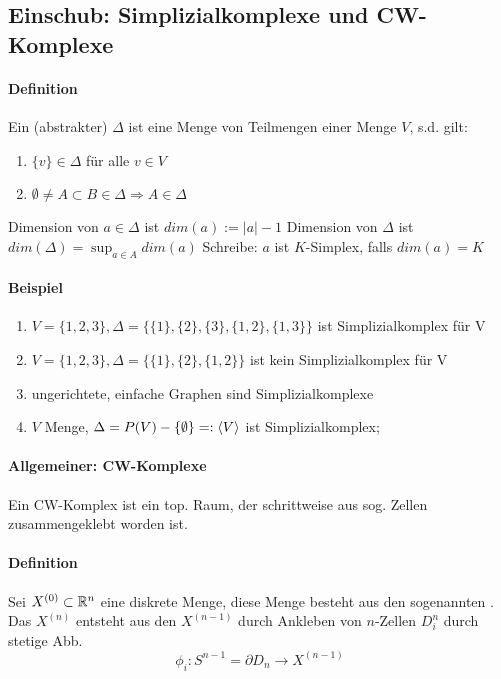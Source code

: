 \documentclass{article}
\begin{document}
\subsection{Einschub: Simplizialkomplexe und CW-Komplexe}
\paragraph{Definition} Ein (abstrakter)  $\Delta$ ist eine Menge von Teilmengen einer Menge $V$, s.d. gilt:
\begin{enumerate}
	\item $\{v\} \in \Delta$ für alle $v \in V$
	\item $\emptyset\neq A \subset B \in \Delta \Longrightarrow A \in \Delta$
\end{enumerate}
Dimension von $a \in \Delta$ ist $dim(a) := |a| -1$
Dimension von $\Delta$ ist $dim(\Delta) = \sup_{a\in A}dim(a)$
Schreibe: $a$ ist $K$-Simplex, falls $dim(a) = K$

\paragraph{Beispiel}
\begin{enumerate}
	\item $V = \{1,2,3\}, \Delta = \{\{1\}, \{2\}, \{3\}, \{1,2\}, \{1,3\}\}$  ist Simplizialkomplex für V
	\item $V = \{1,2,3\}, \Delta = \{\{1\}, \{2\}, \{1,2\}\}$  ist kein Simplizialkomplex für V
	\item ungerichtete, einfache Graphen sind Simplizialkomplexe
	\item $V$ Menge, $\Delta = P(V)-\{\emptyset\} =: \grp{V}{} $ ist Simplizialkomplex;
\end{enumerate}

\paragraph{Allgemeiner: CW-Komplexe}
Ein CW-Komplex ist ein top. Raum, der schrittweise aus sog. Zellen zusammengeklebt worden ist. 
\paragraph{Definition}
Sei $X^{(0)}\subset \mathbb{R}^n$ eine diskrete Menge, diese Menge besteht aus den sogenannten .\\
Das  $X^{(n)}$ entsteht aus den $X^{(n-1)}$ durch Ankleben von $n$-Zellen $D^n_i$ durch stetige Abb.
\[\phi_i : S^{n-1} = \partial D_n \longrightarrow X^{(n-1)} \]
\end{document}
